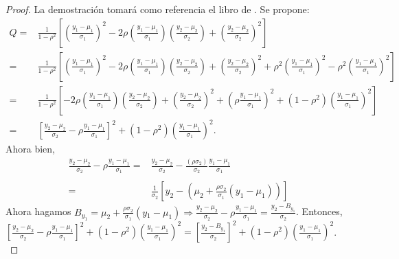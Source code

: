\documentclass[a4paper,12pt]{article}
\begin{document}
\begin{proof}
La demostración tomará como referencia el libro de  \cite{roussas2003introduction}. Se propone:
    \[
    \begin{array}{rl}
        Q = & \displaystyle \frac{1}{1-\rho^2}\left[ \left(\frac{y_1 - \mu_1}{\sigma_1} \right)^2 -2\rho \left( \frac{y_1-\mu_1}{\sigma_1} \right) \left( \frac{y_2-\mu_2}{\sigma_2} \right) + \left( \frac{y_2-\mu_2}{\sigma_2} \right)^2 \right]  \\
          = & \displaystyle \frac{1}{1-\rho^2}\left[ \left(\frac{y_1 - \mu_1}{\sigma_1} \right)^2 -2\rho \left( \frac{y_1-\mu_1}{\sigma_1} \right) \left( \frac{y_2-\mu_2}{\sigma_2} \right) + \left( \frac{y_2-\mu_2}{\sigma_2} \right)^2 + \rho^2 \left(\frac{y_1-\mu_1}{\sigma_1}\right)^2 - \rho^2 \left(\frac{y_1-\mu_1}{\sigma_1}\right)^2 \right]
          \\ 
          = & \displaystyle \frac{1}{1-\rho^2}\left[  -2\rho \left( \frac{y_1-\mu_1}{\sigma_1} \right) \left( \frac{y_2-\mu_2}{\sigma_2} \right) + \left( \frac{y_2-\mu_2}{\sigma_2} \right)^2 + \left(\rho \frac{y_1-\mu_1}{\sigma_1}\right)^2 + (1-\rho^2)\left(\frac{y_1 - \mu_1}{\sigma_1} \right)^2 \right]\\
          = & \left[ \displaystyle \frac{y_2-\mu_2}{\sigma_2} - \rho \frac{y_1-\mu_1}{\sigma_1} \right]^2 + (1-\rho^2) \displaystyle \left( \frac{y_1-\mu_1}{\sigma_1} \right)^2.
    \end{array}
    \]
    Ahora bien,
    \[
    \begin{array}{rl}
         \displaystyle \frac{y_2-\mu_2}{\sigma_2} - \rho \frac{y_1-\mu_1}{\sigma_1} = & \displaystyle \frac{y_2-\mu_2}{\sigma_2} - \frac{(\rho \sigma_2)}{\sigma_2} \frac{y_1-\mu_1}{\sigma_1}  \\\\
         = & \displaystyle \frac{1}{\sigma_2} \left[ y_2-\left( \mu_2 + \frac{\rho\sigma_2}{\sigma_1}(y_1-\mu_1)\right) \right] 
    \end{array}
    \]
    Ahora hagamos $B_{y_1} = \mu_2 + \displaystyle\frac{\rho\sigma_2}{\sigma_1}(y{_1}-\mu_1) \Rightarrow \displaystyle \frac{y_2-\mu_2}{\sigma_2} - \rho \frac{y_1-\mu_1}{\sigma_1} = \displaystyle \frac{y_2-B_{y_1}}{\sigma_2}$. Entonces, $\left[ \displaystyle \frac{y_2-\mu_2}{\sigma_2} - \rho \frac{y_1-\mu_1}{\sigma_1} \right]^2 + (1-\rho^2) \displaystyle \left( \frac{y_1-\mu_1}{\sigma_1} \right)^2 = \left[ \frac{y_2-B_{y_1}}{\sigma_2}\right]^2 + (1-\rho^2) \displaystyle \left( \frac{y_1-\mu_1}{\sigma_1} \right)^2$. \\
    

\end{proof}
\end{document}
